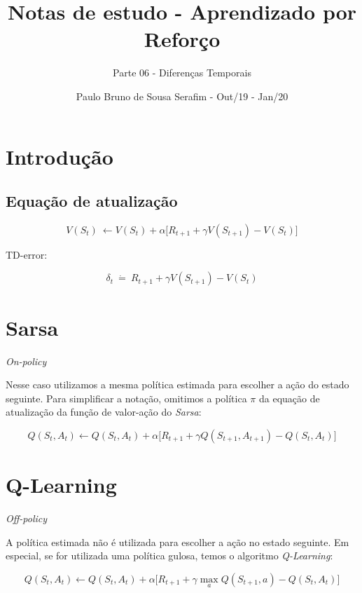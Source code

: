 \documentclass{article}
\title{Notas de estudo - Aprendizado por Reforço}
\author{Parte 06 - Diferenças Temporais}
\date{Paulo Bruno de Sousa Serafim - Out/19 - Jan/20}
\begin{document}
\maketitle

\section{Introdução}

    \subsection{Equação de atualização}
    
        \begin{equation}
            V(S_t) \ \leftarrow V(S_t) + \alpha \Big[ R_{t+1} + \gamma V(S_{t+1}) - V(S_t) \Big]
        \end{equation}
    
        TD-error:
        
        \begin{equation}
            \delta_t \ \dot{=} \ R_{t+1} + \gamma V(S_{t+1}) - V(S_t)
        \end{equation}
    
\section{Sarsa}

    \textit{On-policy}

    Nesse caso utilizamos a mesma política estimada para escolher a ação do estado seguinte. Para simplificar a notação, omitimos a política $\pi$ da equação de atualização da função de valor-ação do \textit{Sarsa}:

    \begin{equation}
        Q(S_t, A_t) \leftarrow Q(S_t, A_t) + \alpha \Big[ R_{t+1} + \gamma Q(S_{t+1}, A_{t+1}) - Q(S_t, A_t) \Big]
    \end{equation}
    
\section{Q-Learning}

    \textit{Off-policy}
    
    A política estimada não é utilizada para escolher a ação no estado seguinte. Em especial, se for utilizada uma política gulosa, temos o algoritmo \textit{Q-Learning}:

    \begin{equation}
        Q(S_t, A_t) \leftarrow Q(S_t, A_t) + \alpha \Big[ R_{t+1} + \gamma \max_{a} Q(S_{t+1}, a) - Q(S_t, A_t) \Big]
    \end{equation}
\end{document}
